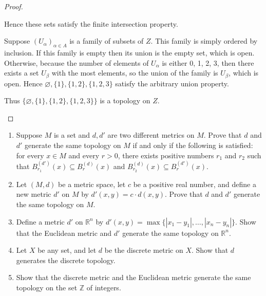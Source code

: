\begin{proof}
\begin{enumerate}[label={(\alph*)}]
		      Hence these sets satisfy the finite intersection property.

		      Suppose ${(U_{\alpha})}_{\alpha\in A}$ is a family of subsets of $Z$. This family is simply ordered by inclusion. If this family is empty then its union is the empty set, which is open. Otherwise, because the number of elements of $U_{\alpha}$ is either 0, 1, 2, 3, then there exists a set $U_{\beta}$ with the most elements, so the union of the family is $U_{\beta}$, which is open. Hence $\varnothing, \{1\}, \{1,2\}, \{1,2,3\}$ satisfy the arbitrary union property.

		      Thus $\{ \varnothing, \{1\}, \{1,2\}, \{1,2,3\} \}$ is a topology on $Z$.
	\end{enumerate}
\end{proof}

\begin{exercise}{2.4}\label{exercise:2.4}
	\begin{enumerate}[label={(\alph*)}]
		\item Suppose $M$ is a set and $d, d'$ are two different metrics on $M$. Prove that $d$ and $d'$ generate the same topology on $M$ if and only if the following is satisfied: for every $x\in M$ and every $r > 0$, there exists positive numbers $r_{1}$ and $r_{2}$ such that $B^{(d')}_{r_{1}}(x)\subseteq B^{(d)}_{r}(x)$ and $B^{(d)}_{r_{2}}(x)\subseteq B^{(d')}_{r}(x)$.
		\item Let $(M, d)$ be a metric space, let $c$ be a positive real number, and define a new metric $d'$ on $M$ by $d'(x, y) = c\cdot d(x, y)$. Prove that $d$ and $d'$ generate the same topology on $M$.
		\item Define a metric $d'$ on $\mathbb{R}^{n}$ by $d'(x, y) = \max\{ \left\vert{x_{1} - y_{1}}\right\vert, \ldots, \left\vert{x_{n} - y_{n}}\right\vert \}$. Show that the Euclidean metric and $d'$ generate the same topology on $\mathbb{R}^{n}$.
		\item Let $X$ be any set, and let $d$ be the discrete metric on $X$. Show that $d$ generates the discrete topology.
		\item Show that the discrete metric and the Euclidean metric generate the same topology on the set $\mathbb{Z}$ of integers.
	\end{enumerate}
\end{exercise}

